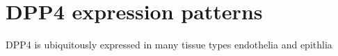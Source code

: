 \section{DPP4 expression patterns}
DPP4 is ubiquitously expressed in many tissue types endothelia and epithlia 